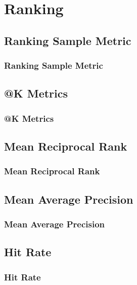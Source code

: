 \chapter{Ranking}


\clearpage
\thispagestyle{rankingstyle}
\section{Ranking Sample Metric}
\subsection{Ranking Sample Metric}


\clearpage
\thispagestyle{rankingstyle}
\section{@K Metrics}
\subsection{@K Metrics}

\clearpage
\thispagestyle{rankingstyle}
\section{Mean Reciprocal Rank}
\subsection{Mean Reciprocal Rank}

\clearpage
\thispagestyle{rankingstyle}
\section{Mean Average Precision}
\subsection{Mean Average Precision}

\clearpage
\thispagestyle{rankingstyle}
\section{Hit Rate}
\subsection{Hit Rate}

